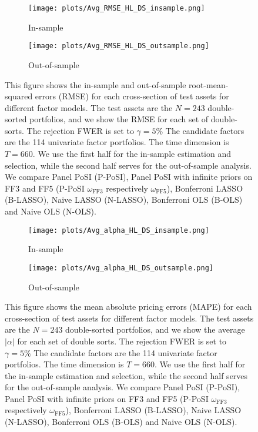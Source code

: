 \documentclass[11pt]{article}
\newcommand\tcaptab[1]{\captionsetup{position=top, font=normalsize, labelfont=bf, textfont=normalfont, justification=centering, margin=0mm, aboveskip=1mm, belowskip=0mm, labelsep=colon, singlelinecheck=false}\caption{#1}}
\newcommand\bnotetab[1]{\captionsetup{position=bottom, font=footnotesize,  textfont=normalfont, margin=1mm, skip=2mm, justification=justified, singlelinecheck=false}\caption*{#1}}
\begin{document}
\begin{figure}[t!]
	\tcaptab{RMSE across cross-sections}
	\label{fig:RMSE}
	\begin{subfigure}[t]{.5\textwidth}\centering
		\texttt{[image: plots/Avg\_RMSE\_HL\_DS\_insample.png]}
		\caption{In-sample}
	\end{subfigure}
	\begin{subfigure}[t]{.5\textwidth}\centering
		\texttt{[image: plots/Avg\_RMSE\_HL\_DS\_outsample.png]}
		\caption{Out-of-sample}
	\end{subfigure}
	\bnotetab{
		This figure shows the in-sample and out-of-sample root-mean-squared errors (RMSE) for each cross-section of test assets for different factor models. The test assets are the $N=243$ double-sorted portfolios, and we show the RMSE for each set of double-sorts. The rejection FWER is set to $\gamma=5\%$ The candidate factors are the 114 univariate factor portfolios. The time dimension is $T=660$. We use the first half for the in-sample estimation and selection, while the second half serves for the out-of-sample analysis. We compare Panel PoSI (P-PoSI), Panel PoSI with infinite priors on FF3 and FF5 (P-PoSI $\omega_{\text{FF3}}$ respectively $\omega_{\text{FF5}}$), Bonferroni LASSO (B-LASSO), Naive LASSO (N-LASSO), Bonferroni OLS (B-OLS) and Naive OLS (N-OLS).          
	}		
\end{figure}

\begin{figure}[t!]
	\tcaptab{MAPE across cross-sections}
	\label{fig:MAPE}
	\begin{subfigure}[t]{.5\textwidth}\centering
		\texttt{[image: plots/Avg\_alpha\_HL\_DS\_insample.png]}
		\caption{In-sample}
	\end{subfigure}
	\begin{subfigure}[t]{.5\textwidth}\centering
		\texttt{[image: plots/Avg\_alpha\_HL\_DS\_outsample.png]}
		\caption{Out-of-sample}
	\end{subfigure}
	\bnotetab{
		This figure shows the mean absolute pricing errors (MAPE) for each cross-section of test assets for different factor models. The test assets are the $N=243$ double-sorted portfolios, and we show the average $|\alpha|$ for each set of double sorts. The rejection FWER is set to $\gamma=5\%$ The candidate factors are the 114 univariate factor portfolios. The time dimension is $T=660$. We use the first half for the in-sample estimation and selection, while the second half serves for the out-of-sample analysis. We compare Panel PoSI (P-PoSI), Panel PoSI with infinite priors on FF3 and FF5 (P-PoSI $\omega_{\text{FF3}}$ respectively $\omega_{\text{FF5}}$), Bonferroni LASSO (B-LASSO), Naive LASSO (N-LASSO), Bonferroni OLS (B-OLS) and Naive OLS (N-OLS).          
	}		
\end{figure}
\end{document}
